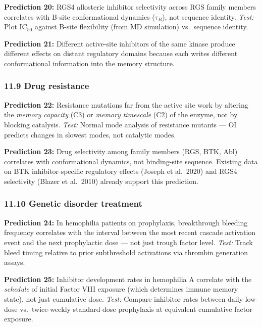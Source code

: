 \documentclass[
]{article}
\begin{document}
\textbf{Prediction 20:} RGS4 allosteric inhibitor selectivity across RGS
family members correlates with B-site conformational dynamics
(\(\tau_B\)), not sequence identity. \emph{Test:} Plot IC\(_{50}\)
against B-site flexibility (from MD simulation) vs.~sequence identity.

\textbf{Prediction 21:} Different active-site inhibitors of the same
kinase produce different effects on distant regulatory domains because
each writes different conformational information into the memory
structure.

\hypertarget{drug-resistance}{%
\subsubsection{11.9 Drug resistance}\label{drug-resistance}}

\textbf{Prediction 22:} Resistance mutations far from the active site
work by altering the \emph{memory capacity} (C3) or \emph{memory
timescale} (C2) of the enzyme, not by blocking catalysis. \emph{Test:}
Normal mode analysis of resistance mutants --- OI predicts changes in
slowest modes, not catalytic modes.

\textbf{Prediction 23:} Drug selectivity among family members (RGS, BTK,
Abl) correlates with conformational dynamics, not binding-site sequence.
Existing data on BTK inhibitor-specific regulatory effects (Joseph et
al.~2020) and RGS4 selectivity (Blazer et al.~2010) already support this
prediction.

\hypertarget{genetic-disorder-treatment}{%
\subsubsection{11.10 Genetic disorder
treatment}\label{genetic-disorder-treatment}}

\textbf{Prediction 24:} In hemophilia patients on prophylaxis,
breakthrough bleeding frequency correlates with the interval between the
most recent cascade activation event and the next prophylactic dose ---
not just trough factor level. \emph{Test:} Track bleed timing relative
to prior subthreshold activations via thrombin generation assays.

\textbf{Prediction 25:} Inhibitor development rates in hemophilia A
correlate with the \emph{schedule} of initial Factor VIII exposure
(which determines immune memory state), not just cumulative dose.
\emph{Test:} Compare inhibitor rates between daily low-dose
vs.~twice-weekly standard-dose prophylaxis at equivalent cumulative
factor exposure.
\end{document}
